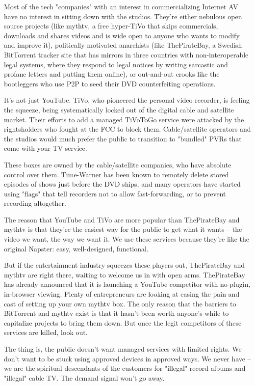 Most of the tech "companies" with an interest in commercializing
Internet AV have no interest in sitting down with the studios.
They're either nebulous open source projects (like mythtv, a free
hyper-TiVo that skips commercials, downloads and shares videos and
is wide open to anyone who wants to modify and improve it),
politically motivated anarchists (like ThePirateBay, a Swedish
BitTorrent tracker site that has mirrors in three countries with
non-interoperable legal systems, where they respond to legal
notices by writing sarcastic and profane letters and putting them
online), or out-and-out crooks like the bootleggers who use P2P to
seed their DVD counterfeiting operations.

It's not just YouTube. TiVo, who pioneered the personal video
recorder, is feeling the squeeze, being systematically locked out
of the digital cable and satellite market. Their efforts to add a
managed TiVoToGo service were attacked by the rightsholders who
fought at the FCC to block them. Cable/satellite operators and the
studios would much prefer the public to transition to "bundled"
PVRs that come with your TV service.

These boxes are owned by the cable/satellite companies, who have
absolute control over them. Time-Warner has been known to remotely
delete stored episodes of shows just before the DVD ships, and many
operators have started using "flags" that tell recorders not to
allow fast-forwarding, or to prevent recording altogether.

The reason that YouTube and TiVo are more popular than ThePirateBay
and mythtv is that they're the easiest way for the public to get
what it wants -- the video we want, the way we want it. We use
these services because they're like the original Napster: easy,
well-designed, functional.

But if the entertainment industry squeezes these players out,
ThePirateBay and mythtv are right there, waiting to welcome us in
with open arms. ThePirateBay has already announced that it is
launching a YouTube competitor with no-plugin, in-browser viewing.
Plenty of entrepreneurs are looking at easing the pain and cast of
setting up your own mythtv box. The only reason that the barriers
to BitTorrent and mythtv exist is that it hasn't been worth
anyone's while to capitalize projects to bring them down. But once
the legit competitors of these services are killed, look out.

The thing is, the public doesn't want managed services with limited
rights. We don't want to be stuck using approved devices in
approved ways. We never have -- we are the spiritual descendants of
the customers for "illegal" record albums and "illegal" cable TV.
The demand signal won't go away.

